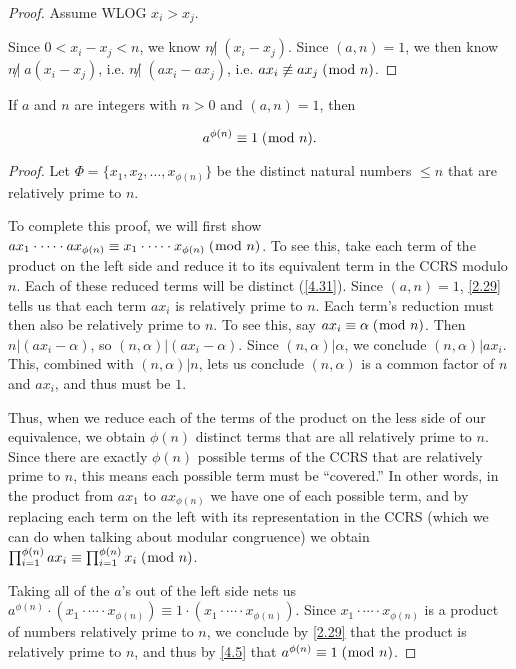 \documentclass[../main.tex]{subfiles}
\begin{document}
\begin{proof}
  Assume WLOG $x_i > x_j$.

  Since $0 < x_i - x_j < n$, we know $n \not | \; (x_i - x_j)$. Since $(a, n) = 1$, we then know $n \not | \; a(x_i - x_j)$, i.e. $n \not | \; (ax_i - ax_j)$, i.e. $ax_i \not \equiv ax_j \; (\bmod \; n)$.
\end{proof}



\begin{thm} \label{4.32}
  If $a$ and $n$ are integers with $n > 0$ and $(a, n) = 1$, then

  $$a^{\phi (n)} \equiv 1 \; (\bmod \; n) .$$
\end{thm}

\begin{proof}
  Let $\Phi = \{x_1, x_2, \ldots, x_{\phi (n)} \}$ be the distinct natural numbers $\leq n$ that are relatively prime to $n$.

  To complete this proof, we will first show $ax_1 \cdot \cdots \cdot ax_{\phi (n)} \equiv x_1 \cdot \cdots \cdot x_{\phi (n)} \; (\bmod \; n)$. To see this, take each term of the product on the left side and reduce it to its equivalent term in the CCRS modulo $n$. Each of these reduced terms will be distinct (\ref{4.31}). Since $(a, n) = 1$, \ref{2.29} tells us that each term $ax_i$ is relatively prime to $n$. Each term's reduction must then also be relatively prime to $n$.
  To see this, say $ax_i \equiv \alpha \; (\bmod \; n)$. Then $n | (ax_i - \alpha)$, so $(n, \alpha) | (ax_i - \alpha)$. Since $(n, \alpha) | \alpha$, we conclude $(n, \alpha) | ax_i$. This, combined with $(n, \alpha) | n$, lets us conclude $(n, \alpha)$ is a common factor of $n$ and $ax_i$, and thus must be $1$.

  Thus, when we reduce each of the terms of the product on the less side of our equivalence, we obtain $\phi (n)$ distinct terms that are all relatively prime to $n$. Since there are exactly $\phi (n)$ possible terms of the CCRS that are relatively prime to $n$, this means each possible term must be ``covered.'' In other words, in the product from $ax_1$ to $ax_{\phi (n)}$ we have one of each possible term, and by replacing each term on the left with its representation in the CCRS (which we can do when talking about modular congruence) we obtain $\prod_{i=1}^{\phi (n)} ax_i \equiv \prod_{i=1}^{\phi (n)} x_i \; (\bmod \; n)$.

  Taking all of the $a$'s out of the left side nets us $a^{\phi (n)} \cdot (x_1 \cdot \cdots \cdot x_{\phi (n)}) \equiv 1 \cdot (x_1 \cdot \cdots \cdot x_{\phi (n)})$. Since $x_1 \cdot \cdots \cdot x_{\phi (n)}$ is a product of numbers relatively prime to $n$, we conclude by \ref{2.29} that the product is relatively prime to $n$,
  and thus by \ref{4.5} that $a^{\phi (n)} \equiv 1 \; (\bmod \; n)$.
\end{proof}
\end{document}
